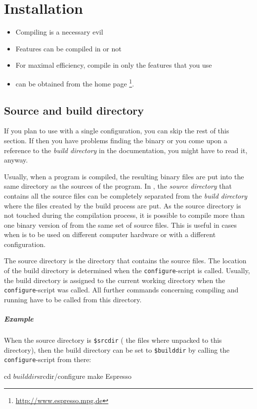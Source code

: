 \chapter{Installation}
\label{chap:install}

\begin{itemize}
\item Compiling \es{} is a necessary evil
\item Features can be compiled in or not
\item For maximal efficiency, compile in only the features that you
  use
\item \es{} can be obtained from the \es{} home page
  \footnote{\url{http://www.espresso.mpg.de}}.
\end{itemize}


\section{Source and build directory}
\label{sec:builddir}
 

If you plan to use \es{} with a single configuration, you can skip the
rest of this section. If then you have problems finding the \es{}
binary or you come upon a reference to the \emph{build directory} in
the documentation, you might have to read it, anyway. 

Usually, when a program is compiled, the resulting binary files are
put into the same directory as the sources of the program. In \es{},
the \emph{source directory} that contains all the source files can be
completely separated from the \emph{build directory} where the files
created by the build process are put. As the source directory is not
touched during the compilation process, it is possible to compile more
than one binary version of \es{} from the same set of source files.
This is useful in cases when \es{} is to be used on different computer
hardware or with a different configuration.

The source directory is the directory that contains the source files.
The location of the build directory is determined when the
\texttt{configure}-script is called.  Usually, the build directory is
assigned to the current working directory when the
\texttt{configure}-script was called. All further commands concerning
compiling and running \es{} have to be called from this directory.

\paragraph{Example}
When the source directory is \texttt{\$srcdir} (\ie{} the files where
unpacked to this directory), then the build directory can be set to
\texttt{\$builddir} by calling the \texttt{configure}-script from
there:
\begin{code}
cd $builddir
$srcdir/configure
make
Espresso
\end{code}

